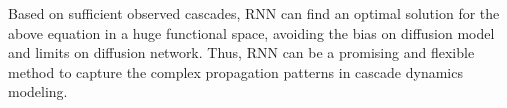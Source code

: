 Based on sufficient observed cascades, RNN
can find an optimal solution for the above equation
in a huge functional space, avoiding the bias on diffusion
model and limits on diffusion network.
Thus, RNN can be a promising and flexible method to capture the complex
propagation patterns in cascade dynamics modeling. 

